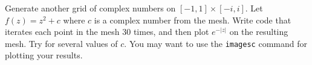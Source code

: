 \begin{problem}
Generate another grid of complex numbers on $[-1,1]\times[-i,i]$.  Let $f(z) = z^2 + c$ where $c$ is a complex number from the mesh.  Write code that iterates each point in the mesh 30 times, and then plot $e^{-|z|}$ on the resulting mesh.  Try for several values of $c$.  You may want to use the {\tt imagesc} command for plotting your results.
\end{problem}




